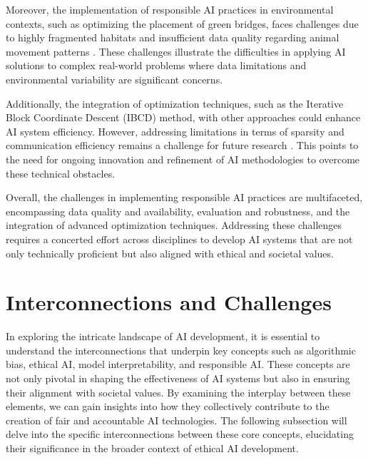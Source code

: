 Moreover, the implementation of responsible AI practices in environmental contexts, such as optimizing the placement of green bridges, faces challenges due to highly fragmented habitats and insufficient data quality regarding animal movement patterns \cite{fluschnik2024placinggreenbridgesoptimally}. These challenges illustrate the difficulties in applying AI solutions to complex real-world problems where data limitations and environmental variability are significant concerns.

Additionally, the integration of optimization techniques, such as the Iterative Block Coordinate Descent (IBCD) method, with other approaches could enhance AI system efficiency. However, addressing limitations in terms of sparsity and communication efficiency remains a challenge for future research \cite{mishchenko201999distributedoptimizationwaste}. This points to the need for ongoing innovation and refinement of AI methodologies to overcome these technical obstacles.

Overall, the challenges in implementing responsible AI practices are multifaceted, encompassing data quality and availability, evaluation and robustness, and the integration of advanced optimization techniques. Addressing these challenges requires a concerted effort across disciplines to develop AI systems that are not only technically proficient but also aligned with ethical and societal values.






\section{Interconnections and Challenges} \label{sec:Interconnections and Challenges}

In exploring the intricate landscape of AI development, it is essential to understand the interconnections that underpin key concepts such as algorithmic bias, ethical AI, model interpretability, and responsible AI. These concepts are not only pivotal in shaping the effectiveness of AI systems but also in ensuring their alignment with societal values. By examining the interplay between these elements, we can gain insights into how they collectively contribute to the creation of fair and accountable AI technologies. The following subsection will delve into the specific interconnections between these core concepts, elucidating their significance in the broader context of ethical AI development.






